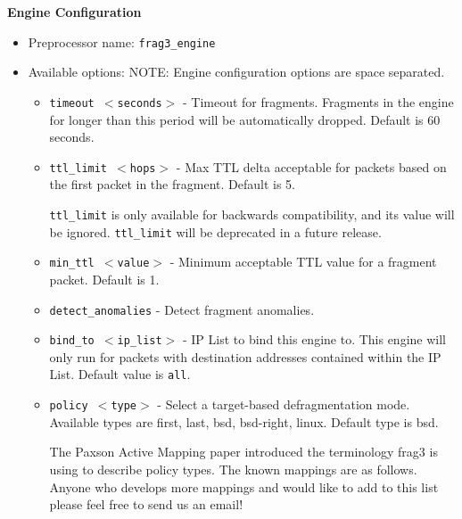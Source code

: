\documentclass[english]{report}
\newenvironment{note}{
\samepage
    \vspace{10pt}{\textsf{
        {\hspace{7pt}\Huge{$\triangle$\hspace{-12.5pt}{\Large{$^!$}}}}\hspace{5pt}
        {\Large{NOTE}}
    }
    }
   \begin{center}
    \par\vspace{-17pt}

    \begin{lrbox}{\savepar}
    \begin{minipage}[r]{6in}
}
{
    \end{minipage}
    \end{lrbox}
    \fbox{
        \usebox{
            \savepar
	}
    }
    \par\vskip10pt
    \end{center}
}
\begin{document}
\textbf{Engine Configuration}
\begin{itemize}
\item Preprocessor name: \texttt{frag3\_engine}
\item Available options:
  NOTE: Engine configuration options are space separated.
  \begin{itemize}
  \item   \texttt{timeout $<$seconds$>$} - Timeout for fragments.  Fragments in the engine for 
                         longer than this period will be automatically dropped.
                         Default is 60 seconds.
                         
  \item   \texttt{ttl\_limit $<$hops$>$} - Max TTL delta acceptable for packets based on the first
                        packet in the fragment.  Default is 5.
\begin{note}
\texttt{ttl\_limit} is only available for backwards compatibility,
and its value will be ignored.  \texttt{ttl\_limit} will be deprecated
in a future release.
\end{note}

                        
  \item   \texttt{min\_ttl $<$value$>$} - Minimum acceptable TTL value for a fragment packet.  
                       Default is 1.
                       
  \item  \texttt{detect\_anomalies} - Detect fragment anomalies.
     
   \item  \texttt{bind\_to $<$ip\_list$>$} - IP List to bind this engine to.  This engine will only
                         run for packets with destination addresses contained
                         within the IP List.  Default value is \texttt{all}.
                         
   \item \texttt{policy $<$type$>$} - Select a target-based defragmentation mode.  Available 
                     types are first, last, bsd, bsd-right, linux.  Default
                     type is bsd.

                     The Paxson Active Mapping paper introduced the terminology
                     frag3 is using to describe policy types.  The known 
                     mappings are as follows.  Anyone who develops more 
                     mappings and would like to add to this list please feel
                     free to send us an email!
                     

\end{itemize}
\end{itemize}
\end{document}
